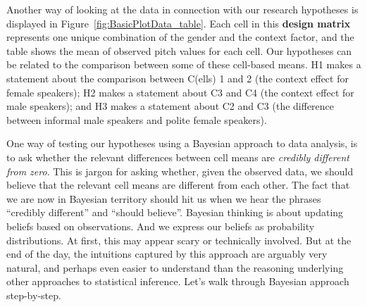 \documentclass[nobib]{tufte-handout}
\newcommand{\tr}[1]{\textcolor{DarkOrange}{[tr: #1]}}
\begin{document}
Another way of looking at the data in connection with our research hypotheses is displayed in
Figure~\ref{fig:BasicPlotData_table}. Each cell in this \textbf{design matrix} represents one
unique combination of the gender and the context factor, and the table shows the mean of
observed pitch values for each cell.
%
%
Our hypotheses can be related to the comparison between some of these cell-based means.
H1 makes a statement about the comparison between C(ells) 1 and 2 (the context effect for female speakers); H2 makes a statement about C3 and C4 (the context effect for male speakers); and H3 makes a statement about C2 and C3 (the difference between informal male speakers and polite female speakers).

One way of testing our hypotheses using a Bayesian approach to data analysis, is to ask whether the relevant differences between cell means are \textit{credibly different from zero}. This is jargon for asking whether, given the observed data, we should believe that the relevant cell means are different from each other. The fact that we are now in Bayesian territory should hit us when we hear the phrases ``credibly different'' and ``should believe''. Bayesian thinking is about updating beliefs based on observations. And we express our beliefs as probability distributions. 
At first, this may appear scary or technically involved. But at the end of the day, the intuitions captured by this approach are arguably very natural, and perhaps even easier to understand than the reasoning underlying other approaches to statistical inference. Let's walk through Bayesian approach step-by-step.
\end{document}
